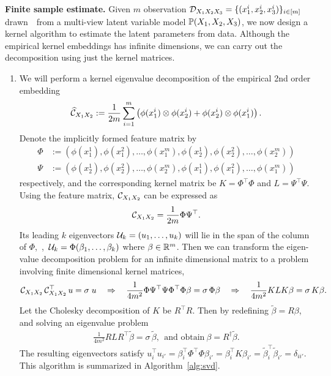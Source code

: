 \documentclass[11pt]{article}
\begin{document}
{\bf Finite sample estimate.} Given $m$ observation $\mathcal{D}_{X_1 X_2 X_3}=\{(x_1^i,x_2^i,x_3^i)\}_{i \in [m]}$ drawn~\iid~from a multi-view latent variable model $\mathbb{P}(X_1,X_2,X_3)$, we now design a kernel algorithm to estimate the latent parameters from data. Although the empirical kernel embeddings has infinite dimensions, we can carry out the decomposition using just the kernel matrices.

\begin{enumerate}

\item We will perform a kernel eigenvalue decomposition of the empirical 2nd order embedding 
$$
  \widehat {\mathcal{C}}_{X_1 X_2}:= \frac{1}{2m} \sum_{i=1}^{m} \left(\phi(x_1^i) \otimes \phi(x_2^i) + \phi(x_2^i) \otimes \phi(x_1^i)\right).
$$ 
Denote the implicitly formed feature matrix by 
\begin{align*}
  \Phi &:= (\phi(x_1^1),  \phi(x_1^2), \ldots, \phi(x_1^m), \phi(x_2^1),  \phi(x_2^2), \ldots, \phi(x_2^m))  \\
  \Psi &:= (\phi(x_2^1), \phi(x_2^2), \ldots, \phi(x_2^m), \phi(x_1^1),  \phi(x_1^2), \ldots, \phi(x_1^m))  
\end{align*}
respectively, and the corresponding kernel matrix be $K = \Phi^\top \Phi$ and $L = \Psi^\top \Psi$. Using the feature matrix, $\mathcal{C}_{X_1 X_2}$ can be expressed as
$$
	\mathcal{C}_{X_1 X_2} = \frac{1}{2m} \Phi \Psi^\top.
$$
Its leading $k$ eigenvectors $\mathcal{U}_k = (u_1,\ldots,u_k)$ will lie in the span of the column of  $\Phi$,~\ie,~$\mathcal{U}_k = \Phi (\beta_1,\ldots,\beta_k)$ where $\beta \in \mathbb{R}^m$. Then we can transform the eigen-value decomposition problem for an infinite dimensional matrix to a problem involving finite dimensional kernel matrices,
$$
	\mathcal{C}_{X_1 X_2}\, \mathcal{C}_{X_1 X_2}^\top\, u = \sigma \;u
	\quad \Rightarrow \quad
	\frac{1}{4m^2}\Phi \Psi^\top \Psi \Phi^\top \Phi \beta = \sigma\,\Phi \beta
	\quad \Rightarrow \quad
	\frac{1}{4m^2} K L K \beta = \sigma \,K \beta.
$$
Let the Cholesky decomposition of $K$ be $R^\top R$. Then by redefining $\widetilde{\beta}=R\beta$, and solving an eigenvalue problem
\begin{align}
 \frac{1}{4m^2} R L R^\top \widetilde{\beta} = \sigma \, \widetilde{\beta},~~\text{and obtain}~\beta = R^{\dagger} \widetilde{\beta}.
\end{align}
The resulting eigenvectors satisfy $u_i^\top u_{i'} = \beta_i^\top \Phi^\top \Phi \beta_{i'} =  \beta_{i}^\top K  \beta_{i'} =  \widetilde{\beta}_{i}^\top \widetilde{\beta}_{i'}=\delta_{ii'}$.
This algorithm is summarized in Algorithm~\ref{alg:svd}. 


\end{enumerate}
\end{document}
